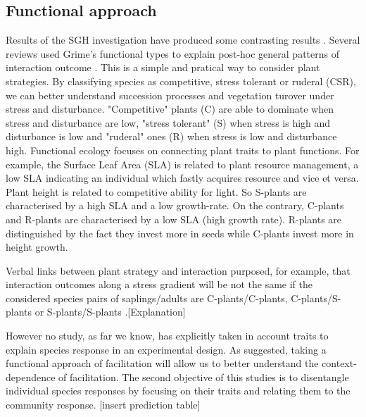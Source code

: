 \documentclass[12pt]{article} %
\begin{document}
\subsection{Functional approach}
Results of the SGH investigation have produced some contrasting results \citep{Maestre2009}. Several reviews used Grime's functional types to explain post-hoc general patterns of interaction outcome \citep{Maestre2009,Butterfield2013}. %
This is a simple and pratical way to consider plant strategies. By classifying species as competitive, stress tolerant or ruderal (CSR), we can better understand succession processes \citep{Raevel2012} and vegetation turover under stress and disturbance. "Competitive" plants (C) are able to dominate when stress and disturbance are low, "stress tolerant" (S) when stress is high and disturbance is low and "ruderal" ones (R) when stress is low and disturbance high.%
 Functional ecology focuses on connecting plant traits to plant functions. For example, the Surface Leaf Area (SLA) is related to plant resource management, a low SLA indicating an individual which fastly acquires resource and vice et versa. Plant height is related to competitive ability for light. So S-plants are characterised by a high SLA and a low growth-rate. On the contrary, C-plants and R-plants are characterised by a low SLA (high growth rate). R-plants are distinguished by the fact they invest more in seeds while C-plants invest more in height growth.

Verbal links between plant strategy and interaction purposed, for example, that interaction outcomes along a stress gradient will be not the same if the considered species pairs of saplings/adults are C-plants/C-plants, C-plants/S-plants or S-plants/S-plants \citep{Maestre2009}.[Explanation]

However no study, as far we know, has explicitly taken in account traits to explain species response in an experimental design. As \citet{Butterfield2013} suggested, taking a functional approach of facilitation will allow us to better understand the context-dependence of facilitation. The second objective of this studies is to disentangle individual species responses by focusing on their traits and relating them to the community response. 
[insert prediction table]
\end{document}
